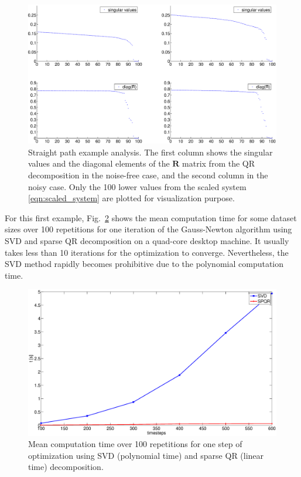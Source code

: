 \begin{figure}[t]
\centering
\includegraphics[width=\columnwidth]{fig/straight-path-merged.eps}
\caption{Straight path example analysis. The first column shows the singular
  values and the diagonal elements of the $\mathbf{R}$ matrix from the QR
  decomposition in the noise-free case, and the second column in the noisy
  case. Only the 100 lower values from the scaled system
  \eqref{eqn:scaled_system} are plotted for visualization purpose.}
\label{fig:straight-path-analysis}
\end{figure}

For this first example, Fig.~\ref{fig:straight-path-time} shows the mean
computation time for some dataset sizes over 100 repetitions for one iteration
of the Gauss-Newton algorithm using SVD and sparse QR decomposition on a
quad-core desktop machine. It usually takes less than 10 iterations for the
optimization to converge. Nevertheless, the SVD method rapidly becomes
prohibitive due to the polynomial computation time.

\begin{figure}[t]
\centering
\includegraphics[width=\columnwidth]{fig/straight-path-time.eps}
\caption{Mean computation time over 100 repetitions for one step of
  optimization using SVD (polynomial time) and sparse QR (linear time)
  decomposition.}
\label{fig:straight-path-time}
\end{figure}

